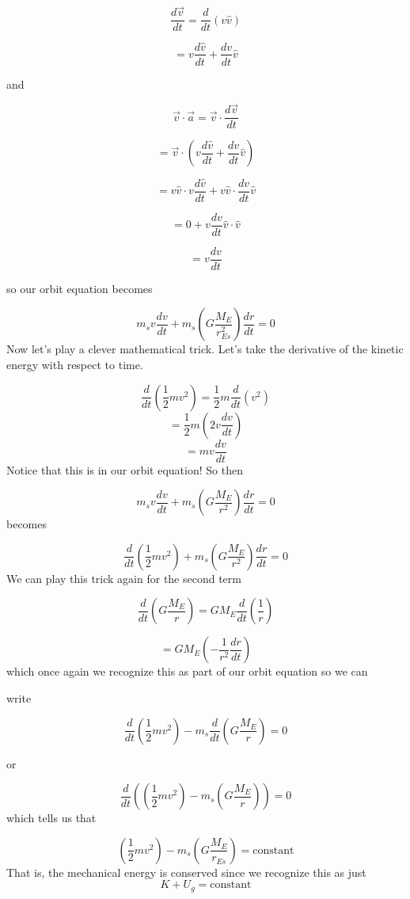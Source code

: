 $$\frac{d\overrightarrow{v}}{dt}=\frac{d}{dt}\left( v\hat{v}\right) $$

$$=v\frac{d\hat{v}}{dt}+\frac{dv}{dt}\hat{v}$$

and 

$$\overrightarrow{v}\cdot \overrightarrow{a}=\overrightarrow{v}\cdot \frac{d\overrightarrow{v}}{dt}$$

$$=\overrightarrow{v}\cdot \left( v\frac{d\hat{v}}{dt}+\frac{dv}{dt}\hat{v}\right)
$$

$$=v\hat{v}\cdot v\frac{d\hat{v}}{dt}+v\hat{v}\cdot \frac{dv}{dt}\hat{v}$$

$$=0+v\frac{dv}{dt}\hat{v}\cdot \hat{v}$$

$$=v\frac{dv}{dt}$$

so our orbit equation becomes

$$m_{s}v\frac{dv}{dt}+m_{s}\left( G\frac{M_{E}}{r_{Es}^{2}}\right) \frac{dr}{dt}=0
$$
Now let's play a clever mathematical trick. Let's take the derivative of the
kinetic energy with respect to time.

$$\frac{d}{dt}\left( \frac{1}{2}mv^{2}\right) =\frac{1}{2}m\frac{d}{dt}\left(v^{2}\right) 
$$%
$$=\frac{1}{2}m\left( 2v\frac{dv}{dt}\right) 
$$%
$$=mv\frac{dv}{dt}$$%
Notice that this is in our orbit equation! So then%

$$m_{s}v\frac{dv}{dt}+m_{s}\left( G\frac{M_{E}}{r^{2}}\right) \frac{dr}{dt}=0
$$%
becomes 

$$\frac{d}{dt}\left( \frac{1}{2}mv^{2}\right) +m_{s}\left( G\frac{M_{E}}{r^{2}}\right) \frac{dr}{dt}=0$$%
We can play this trick again for the second term%

$$
\frac{d}{dt}\left( G\frac{M_{E}}{r}\right) =GM_{E}\frac{d}{dt}\left( \frac{1}{r}\right) 
$$
	
$$
=GM_{E}\left( -\frac{1}{r^{2}}\frac{dr}{dt}\right) 
$$
which once again we recognize this as part of our orbit equation so we can

write 

$$\frac{d}{dt}\left( \frac{1}{2}mv^{2}\right) -m_{s}\frac{d}{dt}\left( G\frac{M_{E}}{r}\right) =0$$

or 

$$\frac{d}{dt}\left( \left( \frac{1}{2}mv^{2}\right) -m_{s}\left( G\frac{M_{E}}{r}\right) \right) =0 
$$%
which tells us that 

$$
\left( \frac{1}{2}mv^{2}\right) -m_{s}\left( G\frac{M_{E}}{r_{Es}}\right) =\text{constant} 
$$
That is, the mechanical energy is conserved since we recognize this as just 
$$K+U_{g}=\text{constant} $$

